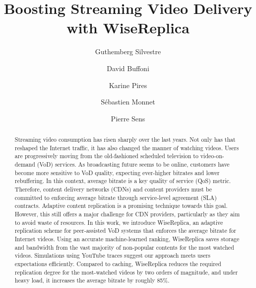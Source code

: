 \documentclass{llncs}
\begin{document}
\title{Boosting Streaming Video Delivery with WiseReplica}


\author{Guthemberg Silvestre \and David Buffoni \and  Karine Pires \and S\'{e}bastien Monnet \and Pierre Sens}


\maketitle

\begin{abstract}

Streaming video consumption has risen sharply over the last years. Not only has that reshaped the Internet traffic, it has also changed the manner of watching videos. Users are progressively moving from the old-fashioned scheduled television to video-on-demand (VoD) services. As broadcasting future seems to be online, customers have become more sensitive to VoD quality, expecting ever-higher bitrates and lower rebuffering. In this context, average bitrate is a key quality of service (QoS) metric. Therefore, content delivery networks (CDNs) and content providers must be committed to enforcing average bitrate through service-level agreement (SLA) contracts. Adaptive content replication is a promising technique towards this goal. However, this still offers a major challenge for CDN providers, particularly as they aim to avoid waste of resources. In this work, we introduce WiseReplica, an adaptive replication scheme for peer-assisted VoD systems that enforces the average bitrate for Internet videos. Using an accurate machine-learned ranking, WiseReplica saves storage and bandwidth from the vast majority of non-popular contents for the most watched videos. Simulations using YouTube traces suggest our approach meets users expectations efficiently.  Compared to caching, WiseReplica reduces the required replication degree for the most-watched videos by two orders of magnitude, and under heavy load, it increases the average bitrate by roughly 85\%.

\end{abstract}
\end{document}
